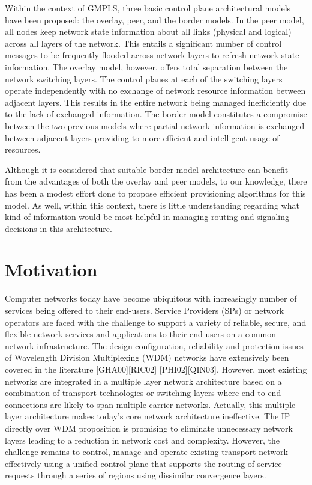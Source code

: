 Within the context of GMPLS, three basic control plane architectural models have been proposed: the overlay, peer, and the border models. In the peer model, all nodes keep network state information about all links (physical and logical) across all layers of the network. This entails a significant number of control messages to be frequently flooded across network layers to refresh network state information. The overlay model, however, offers total separation between the network switching layers.  The control planes at each of the switching layers operate independently with no exchange of network resource information between adjacent layers. This results in the entire network being managed inefficiently due to the lack of exchanged information. The border model constitutes a compromise between the two previous models where partial network information is exchanged between adjacent layers providing to more efficient and intelligent usage of resources.

Although it is considered that suitable border model architecture can benefit from the advantages of both the overlay and peer models, to our knowledge, there has been a modest effort done to propose efficient provisioning algorithms for this model. As well, within this context, there is little understanding regarding what kind of information would be most helpful in managing routing and signaling decisions in this architecture.

\section{Motivation}
Computer networks today have become ubiquitous with increasingly number of services being offered to their end-users. Service Providers (SPs) or network operators are faced with the challenge to support a variety of reliable, secure, and flexible network services and applications to their end-users on a common network infrastructure.
The design configuration, reliability and protection issues of Wavelength Division Multiplexing (WDM) networks have extensively been covered in the literature [GHA00][RIC02] [PHI02][QIN03]. However, most existing networks are integrated in a multiple layer network architecture based on a combination of transport technologies or switching layers where end-to-end connections are likely to span multiple carrier networks. Actually, this multiple layer architecture makes today's core network architecture ineffective. The IP directly over WDM proposition is promising to eliminate unnecessary network layers leading to a reduction in network cost and complexity. However, the challenge remains to control, manage and operate existing transport network effectively using a unified control plane that supports the routing of service requests through a series of regions using dissimilar convergence layers.

